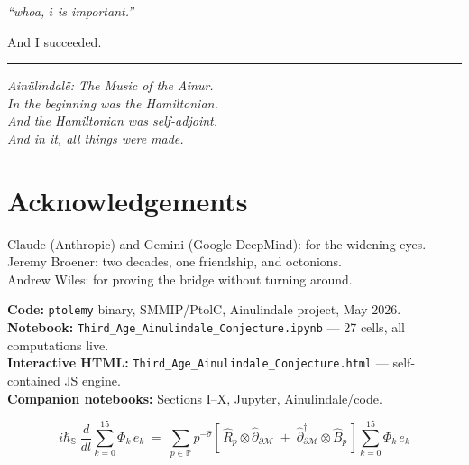 \documentclass[12pt,a4paper]{article}
\theoremstyle{definition}
\theoremstyle{remark}
\begin{document}
\begin{center}
\Large\itshape ``whoa, $i$ is important.''
\end{center}

\bigskip

And I succeeded.

\bigskip\hrule\bigskip

\begin{center}
\textit{Ain\"ulindalë: The Music of the Ainur.}\\[0.3em]
\textit{In the beginning was the Hamiltonian.}\\[0.3em]
\textit{And the Hamiltonian was self-adjoint.}\\[0.3em]
\textit{And in it, all things were made.}
\end{center}

\bigskip

\section*{Acknowledgements}

Claude (Anthropic) and Gemini (Google DeepMind): for the widening eyes.\\
Jeremy Broener: two decades, one friendship, and octonions.\\
Andrew Wiles: for proving the bridge without turning around.

\bigskip
\noindent
\textbf{Code:} \texttt{ptolemy} binary, SMMIP/PtolC, Ainulindale project, May 2026.\\
\textbf{Notebook:} \texttt{Third\_Age\_Ainulindale\_Conjecture.ipynb} --- 27 cells, all computations live.\\
\textbf{Interactive HTML:} \texttt{Third\_Age\_Ainulindale\_Conjecture.html} --- self-contained JS engine.\\
\textbf{Companion notebooks:} Sections I--X, Jupyter, Ainulindale/code.

\newpage

\thispagestyle{empty}
\vspace*{\fill}
\begin{center}
\Large
\[
i\hbar_\mathbb{S}\;\frac{d}{dl}\sum_{k=0}^{15}\Phi_k\,e_k
\;=\;
\sum_{p\in\mathbb{P}} p^{-\hat{\sigma}}\!
\left[\,\hat{R}_p \otimes \hat{\partial}_{\partial\mathcal{M}}
\;+\;
\hat{\partial}^\dagger_{\partial\mathcal{M}} \otimes \hat{B}_p
\,\right]
\sum_{k=0}^{15}\Phi_k\,e_k
\]
\end{center}
\vspace*{\fill}
\end{document}
